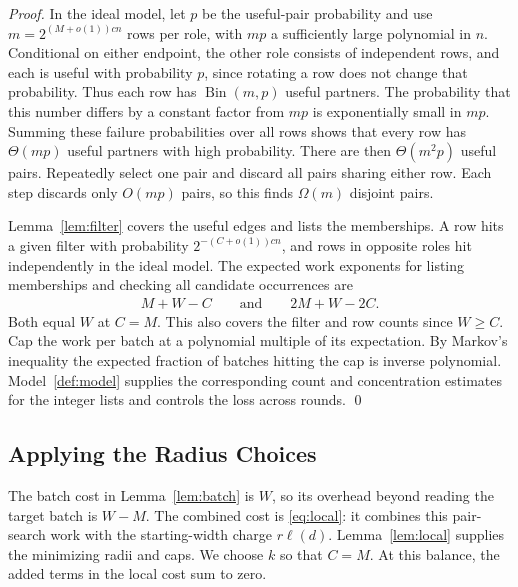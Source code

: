 \documentclass[runningheads,envcountsame,envcountsect,orivec]{llncs}
\begin{document}
\begin{proof}
In the ideal model, let $p$ be the useful-pair probability and use
$m=2^{(M+o(1))cn}$ rows per role, with $mp$ a sufficiently large
polynomial in $n$. Conditional on either endpoint, the other
role consists of independent rows, and each is useful with
probability $p$, since rotating a row does not change that
probability. Thus each row has $\operatorname{Bin}(m,p)$ useful
partners. The probability that this number differs by a constant
factor from $mp$ is exponentially small in $mp$. Summing these
failure probabilities over all rows shows that every row has
$\Theta(mp)$ useful partners with high probability. There are
then $\Theta(m^2p)$ useful pairs. Repeatedly select one pair and
discard all pairs sharing either row. Each step discards only
$O(mp)$ pairs, so this finds $\Omega(m)$ disjoint pairs.

Lemma~\ref{lem:filter} covers the useful edges and lists the
memberships. A row hits a given filter with probability
$2^{-(C+o(1))cn}$, and rows in opposite roles hit independently
in the ideal model. The expected work exponents for listing
memberships and checking all candidate occurrences are
\begin{align}
 M+W-C \qquad\text{and}\qquad 2M+W-2C.
 \label{eq:operations}
\end{align}
Both equal $W$ at $C=M$. This also covers the filter and row
counts since $W\ge C$. Cap the work per batch at a polynomial
multiple of its expectation. By Markov's inequality the expected
fraction of batches hitting the cap is inverse polynomial.
Model~\ref{def:model} supplies the corresponding count and
concentration estimates for the integer lists and controls
the loss across rounds.
\qed
\end{proof}

\subsection{Applying the Radius Choices}

The batch cost in Lemma~\ref{lem:batch} is $W$, so its
overhead beyond reading the target batch is $W-M$.
The combined cost is \eqref{eq:local}: it combines this
pair-search work with the starting-width charge $r\ell(d)$.
Lemma~\ref{lem:local} supplies the minimizing radii and caps.
We choose $k$ so that $C=M$. At this balance, the added terms
in the local cost sum to zero.
\end{document}
